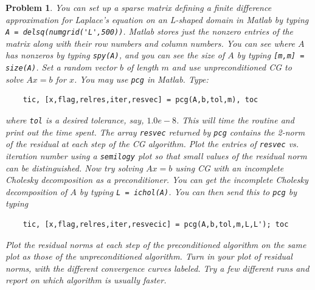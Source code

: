\documentclass[12pt]{report}
\newtheorem{problem}{Problem}
\begin{document}
\newpage



\begin{problem}
    You can set up a sparse matrix defining a finite difference approximation for
    Laplace's equation on an L-shaped domain in Matlab by typing
    \verb+A = delsq(numgrid('L',500))+.  Matlab stores just the nonzero
    entries of the matrix along with their row numbers and column numbers.
    You can see where $A$ has nonzeros by typing \verb+spy(A)+,
    and you can see the size of $A$ by typing \verb+[m,m] = size(A)+.
    Set a random vector $b$ of length $m$ and use unpreconditioned CG
    to solve $Ax=b$ for $x$.  You may use \verb+pcg+ in Matlab.  Type:
    \begin{verbatim}
    tic, [x,flag,relres,iter,resvec] = pcg(A,b,tol,m), toc
    \end{verbatim}
    where \verb+tol+ is a desired tolerance, say, $1.0e-8$.  
    This will time the routine and print out the time spent.
    The array \verb+resvec+ returned by \verb+pcg+ contains the 2-norm of the 
    residual at each step of the CG algorithm.  Plot the entries of \verb+resvec+ 
    vs. iteration number using a \verb+semilogy+ plot so that small values of 
    the residual norm can be distinguished.  Now try solving $Ax=b$ using CG 
    with an incomplete Cholesky decomposition as a preconditioner.  You can 
    get the incomplete Cholesky decomposition of $A$ by typing \verb+L = ichol(A)+.  
    You can then send this to \verb+pcg+ by typing
    \begin{verbatim}
    tic, [x,flag,relres,iter,resvecic] = pcg(A,b,tol,m,L,L'); toc
    \end{verbatim}
    Plot the residual norms at each step of the preconditioned algorithm on
    the same plot as those of the unpreconditioned algorithm.  Turn in your
    plot of residual norms, with the different convergence curves labeled.  
    Try a few different runs and report on which algorithm is usually faster.
\end{problem}
\end{document}
